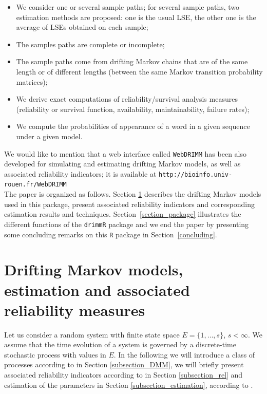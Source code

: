 \documentclass[article,nojss]{jss}\usepackage[]{graphicx}\usepackage[]{color}
\begin{document}
\begin{itemize}
\item We consider one or several sample paths; for several sample paths, two estimation methods are proposed: one is the usual LSE, the other one is the average of LSEs obtained on each sample;
\item The samples paths are complete or incomplete;
\item The sample paths come from drifting Markov chains that are of the same length or of different lengths (between the same Markov transition probability matrices);
\item We derive exact computations of reliability/survival analysis measures (reliability or survival function, availability, maintainability, failure rates);
\item We compute the  probabilities of appearance of a word in a given sequence under a given model.
\end{itemize}

We would like to mention that a web interface called {\tt WebDRIMM} has been also developed \citep[cf.][]{Kom2018} for simulating and estimating drifting Markov models, as well as associated reliability indicators; it is available at \verb|http://bioinfo.univ-rouen.fr/WebDRIMM|\\

The paper is organized as follows. Section \ref{section_DMM} describes the drifting Markov models used in this package, present associated reliability indicators and corresponding estimation results and techniques. Section~\ref{section_package} illustrates the different functions of the {\tt drimmR} package and we end the paper by presenting some concluding remarks on this {\tt R} package in Section~\ref{concluding}.

\section{Drifting Markov models, estimation and associated reliability measures} \label{section_DMM}

Let us consider a random system with finite state space $E=\{1,\ldots, s\}$, $s < \infty.$ We assume that the time evolution of a system is governed by a discrete-time stochastic process with values in $E.$ In the following we will introduce a class of processes according to \citet{Ver08}  in Section \ref{subsection_DMM}, we will briefly present associated reliability indicators  according to \citet{BaVe2018} in Section \ref{subsection_rel} and estimation of the parameters in Section \ref{subsection_estimation}, according to \citet{Ver08,BaVe2018}.
\end{document}
